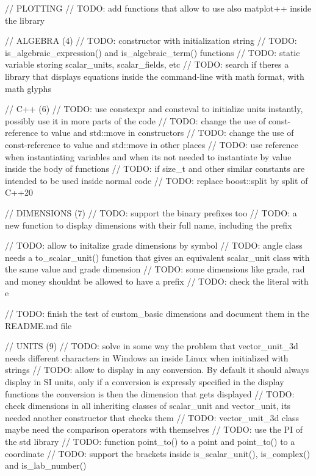 // PLOTTING // TODO\+: add functions that allow to use also matplot++ inside the library

// ALGEBRA (4) // TODO\+: constructor with initialization string // TODO\+: is\+\_\+algebraic\+\_\+expression() and is\+\_\+algebraic\+\_\+term() functions // TODO\+: static variable storing scalar\+\_\+units, scalar\+\_\+fields, etc // TODO\+: search if there\textquotesingle{}s a library that displays equations inside the command-\/line with math format, with math glyphs

// C++ (6) // TODO\+: use constexpr and consteval to initialize units instantly, possibly use it in more parts of the code // TODO\+: change the use of const-\/reference to value and std\+::move in constructors // TODO\+: change the use of const-\/reference to value and std\+::move in other places // TODO\+: use reference when instantiating variables and when it\textquotesingle{}s not needed to instantiate by value inside the body of functions // TODO\+: if size\+\_\+t and other similar constants are intended to be used inside normal code // TODO\+: replace boost\+::split by split of C++20

// DIMENSIONS (7) // TODO\+: support the binary prefixes too // TODO\+: a new function to display dimensions with their full name, including the prefix

// TODO\+: allow to initalize grade dimensions by symbol // TODO\+: angle class needs a to\+\_\+scalar\+\_\+unit() function that gives an equivalent scalar\+\_\+unit class with the same value and grade dimension // TODO\+: some dimensions like grade, rad and money shouldn\textquotesingle{}t be allowed to have a prefix // TODO\+: check the literal with e

// TODO\+: finish the test of custom\+\_\+basic dimensions and document them in the README.\+md file

// UNITS (9) // TODO\+: solve in some way the problem that vector\+\_\+unit\+\_\+3d needs different characters in Windows an inside Linux when initialized with strings // TODO\+: allow to display in any conversion. By default it should always display in SI units, only if a conversion is expressly specified in the display functions the conversion is then the dimension that gets displayed // TODO\+: check dimensions in all inheriting classes of scalar\+\_\+unit and vector\+\_\+unit, it\textquotesingle{}s needed another constructor that checks them // TODO\+: vector\+\_\+unit\+\_\+3d class maybe need the comparison operators with themselves // TODO\+: use the PI of the std library // TODO\+: function point\+\_\+to() to a point and point\+\_\+to() to a coordinate // TODO\+: support the brackets inside is\+\_\+scalar\+\_\+unit(), is\+\_\+complex() and is\+\_\+lab\+\_\+number()

